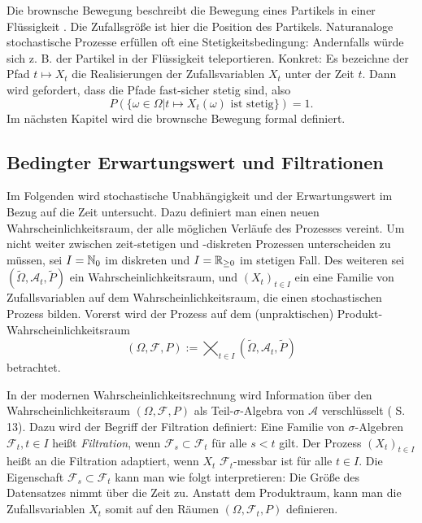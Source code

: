 \begin{bsp}
Die brownsche Bewegung beschreibt die Bewegung eines Partikels in 
einer Flüssigkeit \cite{webster_bb}. Die Zufallsgröße ist hier die Position des Partikels.
Naturanaloge stochastische Prozesse erfüllen oft eine Stetigkeitsbedingung: 
Andernfalls würde sich z. B. der Partikel in der Flüssigkeit teleportieren. 
Konkret: Es bezeichne der Pfad $t \mapsto X_t$ die Realisierungen der Zufallsvariablen $X_t$ unter 
der Zeit $t$. Dann wird gefordert, dass die Pfade fast-sicher stetig sind, also 
$$P(\{\omega \in \Omega | t \mapsto X_t(\omega) \text{ ist stetig}\}) = 1.$$ 
Im nächsten Kapitel wird die brownsche Bewegung formal definiert.
\end{bsp}

\subsection{Bedingter Erwartungswert und Filtrationen}

Im Folgenden wird stochastische Unabhängigkeit und der Erwartungswert im Bezug auf die Zeit untersucht. 
Dazu definiert man einen neuen Wahrscheinlichkeitsraum, 
der alle möglichen Verläufe des Prozesses vereint. 
Um nicht weiter zwischen zeit-stetigen und -diskreten Prozessen unterscheiden zu müssen, 
sei $I = \Bbb N_0$ im diskreten und $I = \Bbb R_{\ge 0}$ im stetigen Fall. 
Des weiteren sei $(\tilde \Omega, \mathcal A_t, \tilde P)$ ein Wahrscheinlichkeitsraum, 
und $(X_t)_{t \in I}$ ein eine Familie von Zufallsvariablen auf dem Wahrscheinlichkeitsraum, 
die einen stochastischen Prozess bilden. Vorerst wird der Prozess 
auf dem (unpraktischen) Produkt-Wahrscheinlichkeitsraum
$$(\Omega, \mathcal F, P) := \bigtimes_{t \in I}(\tilde \Omega, \mathcal A_t,\tilde P)$$
betrachtet.

\begin{defi}[Adaptiertheit]
In der modernen Wahrscheinlichkeitsrechnung wird Information über den
Wahrscheinlichkeitsraum $(\Omega, \mathcal F, P)$ als Teil-$\sigma$-Algebra 
von $\mathcal A$ verschlüsselt (\cite{behrends} S. 13). Dazu wird der Begriff der Filtration 
definiert: Eine Familie von $\sigma$-Algebren $\mathcal F_t, t \in I$ heißt \textit{Filtration}, 
wenn $\mathcal F_s \subset \mathcal F_t$ für alle $s \lt t$ gilt. 
Der Prozess $(X_t)_{t \in I}$ heißt an die Filtration adaptiert, 
wenn $X_t$ $\mathcal F_t$-messbar ist für alle $t \in I$. Die Eigenschaft 
$\mathcal F_s \subset \mathcal F_t$ kann man wie folgt interpretieren: 
Die Größe des Datensatzes nimmt über die Zeit zu. Anstatt dem Produktraum, kann man 
die Zufallsvariablen $X_t$ somit auf den Räumen $(\Omega, \mathcal F_t, P)$ definieren.
\end{defi}

